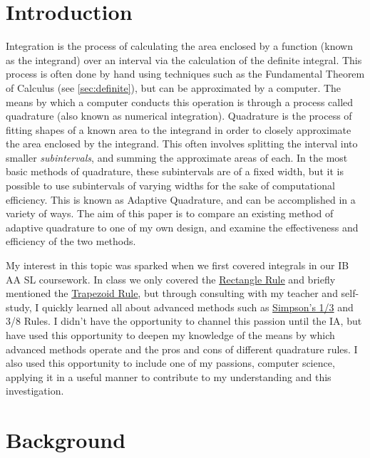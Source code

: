 \documentclass{paper}
\begin{document}
\insertTitlePage
{}
\tableofcontents
\thispagestyle{frontorback}
\newpage
\setcounter{page}{1}
\justifying

\section{Introduction}
\label{sec:intro}
Integration is the process of calculating the area enclosed by a function (known as the integrand) over an interval via the calculation of the definite integral.
This process is often done by hand using techniques such as the Fundamental Theorem of Calculus (see \cref{sec:definite}), but can be approximated by a computer.
The means by which a computer conducts this operation is through a process called quadrature (also known as numerical integration).
Quadrature is the process of fitting shapes of a known area to the integrand in order to closely approximate the area enclosed by the integrand.
This often involves splitting the interval into smaller \textit{subintervals}, and summing the approximate areas of each.
In the most basic methods of quadrature, these subintervals are of a fixed width, but it is possible to use subintervals of varying widths for the sake of computational efficiency.
This is known as Adaptive Quadrature, and can be accomplished in a variety of ways.
The aim of this paper is to compare an existing method of adaptive quadrature to one of my own design, and examine the effectiveness and efficiency of the two methods.

My interest in this topic was sparked when we first covered integrals in our IB AA SL coursework.
In class we only covered the \hyperref[sec:rect_rule]{Rectangle Rule} and briefly mentioned the \hyperref[sec:trap_rule]{Trapezoid Rule}, but through consulting with my teacher and self-study, I quickly learned all about advanced methods such as \hyperref[sec:smps_rule]{Simpson's 1/3} and 3/8 Rules.
I didn't have the opportunity to channel this passion until the IA, but have used this opportunity to deepen my knowledge of the means by which advanced methods operate and the pros and cons of different quadrature rules.
I also used this opportunity to include one of my passions, computer science, applying it in a useful manner to contribute to my understanding and this investigation.

\newpage %

\section{Background}
\label{sec:background}
\end{document}
